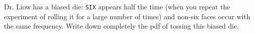 Dr. Liow has a biased die: \texttt{SIX} appears
half the time (when you repeat the experiment of rolling it for a large
number of times)
and non-six faces occur with the same frequency. 
Write down completely the pdf of tossing this biased die.
